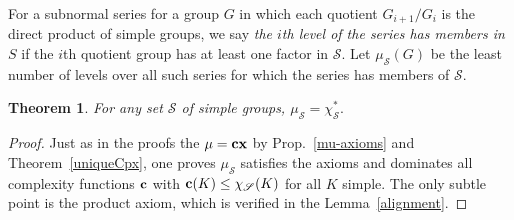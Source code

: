 \documentclass[a4paper,11pt]{amsart}
\newtheorem{theorem}{Theorem}[section]
\theoremstyle{definition}
\newcommand{\cx}{\mbox{\bf cx}}
\renewcommand{\c}{\mbox{\bf c}}
\newcommand{\1}{{\mathbf 1}}
\renewcommand{\S}{{\mathscr{S}}}
\begin{document}
For a subnormal series  for a group $G$ in which each quotient $G_{i+1}/G_i$ is the direct product of simple groups, we say {\em the $i$th level of the series has members in $S$} if the $i$th quotient group has at least one factor in $\S$.
Let $\mu_\S(G)$ be the least number of levels over all such series for which the series has members of $\S$.


\begin{theorem}  For any set $\S$ of simple groups,
$\mu_{\S}=\chi^*_{\S}.$
\end{theorem}
\begin{proof}
Just as in the proofs the $\mu=\cx$ by Prop.~\ref{mu-axioms} and Theorem~\ref{uniqueCpx}, one proves $\mu_
\S$ satisfies the axioms and dominates all complexity functions $\c$ with $\c(K)\leq \chi_{\S}(K)$ for all $K$ simple. The only subtle point is 
the product axiom, which is verified  in the Lemma~\ref{alignment}. \end{proof}
\end{document}
